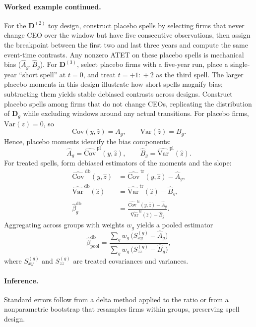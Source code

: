 \documentclass[11pt,a4paper]{article}
\newcommand{\Var}{\text{Var}}
\newcommand{\Cov}{\text{Cov}}
\begin{document}
\paragraph{Worked example continued.} For the $\mathbf D^{(2)}$ toy design, construct placebo spells by selecting firms that never change CEO over the window but have five consecutive observations, then assign the breakpoint between the first two and last three years and compute the same event-time contrasts. Any nonzero ATET on these placebo spells is mechanical bias ($\hat A_g,\hat B_g$). For $\mathbf D^{(3)}$, select placebo firms with a five-year run, place a single-year ``short spell'' at $t=0$, and treat $t=+1\!:\!+2$ as the third spell. The larger placebo moments in this design illustrate how short spells magnify bias; subtracting them yields stable debiased contrasts across designs.
Construct placebo spells among firms that do not change CEOs, replicating the distribution of $\mathbf D_g$ while excluding windows around any actual transitions. For placebo firms, $\Var(z)=0$, so
\begin{equation}
\Cov(y,\hat z) = A_g,\qquad \Var(\hat z)=B_g.
\end{equation}
Hence, placebo moments identify the bias components:
\begin{equation}
\hat A_g = \widehat{\Cov}^{\,\text{pl}}(y,\hat z),\qquad \hat B_g = \widehat{\Var}^{\,\text{pl}}(\hat z).
\end{equation}
For treated spells, form debiased estimators of the moments and the slope:
\begin{align}
\widehat{\Cov}^{\,\text{db}}(y,\hat z) &= \widehat{\Cov}^{\,\text{tr}}(y,\hat z) - \hat A_g,\\
\widehat{\Var}^{\,\text{db}}(\hat z) &= \widehat{\Var}^{\,\text{tr}}(\hat z) - \hat B_g,\\
\hat\beta^{\text{db}}_g &= \frac{\widehat{\Cov}^{\,\text{tr}}(y,\hat z)-\hat A_g}{\widehat{\Var}^{\,\text{tr}}(\hat z)-\hat B_g}.
\end{align}
Aggregating across groups with weights $w_g$ yields a pooled estimator
\begin{equation}
\hat\beta^{\text{db}}_{\text{pool}} = \frac{\sum_g w_g\,\big(S^{(g)}_{xy}-\hat A_g\big)}{\sum_g w_g\,\big(S^{(g)}_{zz}-\hat B_g\big)},
\end{equation}
where $S^{(g)}_{xy}$ and $S^{(g)}_{zz}$ are treated covariances and variances.

\paragraph{Inference.} Standard errors follow from a delta method applied to the ratio or from a nonparametric bootstrap that resamples firms within groups, preserving spell design.
\end{document}
